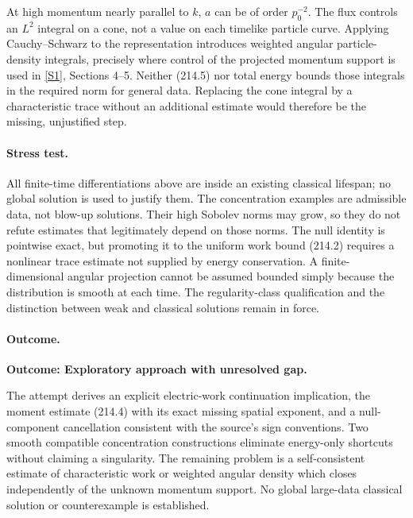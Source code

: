 \documentclass[11pt,a4paper]{article}
\newcommand{\sref}[2]{\hyperlink{source:#1:#2}{[S#2]}}
\begin{document}
At high momentum nearly parallel to $k$, $a$ can be of order $p_0^{-2}$.
The flux controls an $L^2$ integral on a cone, not a value on each timelike
particle curve. Applying Cauchy--Schwarz to the representation introduces
weighted angular particle-density integrals, precisely where control of the
projected momentum support is used in \sref{30006039}{1}, Sections 4--5. Neither
(214.5) nor total energy bounds those integrals in the required norm for
general data. Replacing the cone integral by a characteristic trace without
an additional estimate would therefore be the missing, unjustified step.

\paragraph{Stress test.}
All finite-time differentiations above are inside an existing classical
lifespan; no global solution is used to justify them. The concentration
examples are admissible data, not blow-up solutions. Their high Sobolev
norms may grow, so they do not refute estimates that legitimately depend on
those norms. The null identity is pointwise exact, but promoting it to the
uniform work bound (214.2) requires a nonlinear trace estimate not supplied
by energy conservation. A finite-dimensional angular projection cannot be
assumed bounded simply because the distribution is smooth at each time.
The regularity-class qualification and the distinction between weak and
classical solutions remain in force.

\paragraph{Outcome.}
\textbf{Outcome: Exploratory approach with unresolved gap.}

The attempt derives an explicit electric-work continuation implication, the
moment estimate (214.4) with its exact missing spatial exponent, and a
null-component cancellation consistent with the source's sign conventions.
Two smooth compatible concentration constructions eliminate energy-only
shortcuts without claiming a singularity. The remaining problem is a
self-consistent estimate of characteristic work or weighted angular density
which closes independently of the unknown momentum support. No global
large-data classical solution or counterexample is established.
\end{document}

